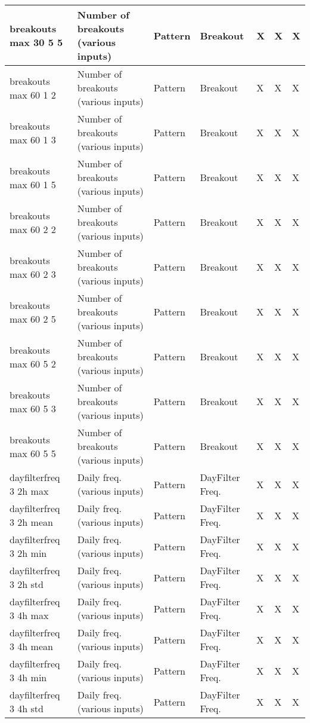{{\begin{longtable}[l]{ | p{4cm} | p{4cm} | p{1cm} | p{2cm} | p{0.3cm} | p{0.3cm} | p{0.3cm} |}
	 breakouts max 30 5 5 & Number of breakouts (various inputs) & Pattern & Breakout & X & X & X \\ \hline
	 breakouts max 60 1 2 & Number of breakouts (various inputs) & Pattern & Breakout & X & X & X \\ \hline
	 breakouts max 60 1 3 & Number of breakouts (various inputs) & Pattern & Breakout & X & X & X \\ \hline
	 breakouts max 60 1 5 & Number of breakouts (various inputs) & Pattern & Breakout & X & X & X \\ \hline
	 breakouts max 60 2 2 & Number of breakouts (various inputs) & Pattern & Breakout & X & X & X \\ \hline
	 breakouts max 60 2 3 & Number of breakouts (various inputs) & Pattern & Breakout & X & X & X \\ \hline
	 breakouts max 60 2 5 & Number of breakouts (various inputs) & Pattern & Breakout & X & X & X \\ \hline
	 breakouts max 60 5 2 & Number of breakouts (various inputs) & Pattern & Breakout & X & X & X \\ \hline
	 breakouts max 60 5 3 & Number of breakouts (various inputs) & Pattern & Breakout & X & X & X \\ \hline
	 breakouts max 60 5 5 & Number of breakouts (various inputs) & Pattern & Breakout & X & X & X \\ \hline
	 dayfilterfreq 3 2h max & Daily freq. (various inputs) & Pattern & DayFilter Freq. & X & X & X \\ \hline
	 dayfilterfreq 3 2h mean & Daily freq. (various inputs) & Pattern & DayFilter Freq. & X & X & X \\ \hline
	 dayfilterfreq 3 2h min & Daily freq. (various inputs) & Pattern & DayFilter Freq. & X & X & X \\ \hline
	 dayfilterfreq 3 2h std & Daily freq. (various inputs) & Pattern & DayFilter Freq. & X & X & X \\ \hline
	 dayfilterfreq 3 4h max & Daily freq. (various inputs) & Pattern & DayFilter Freq. & X & X & X \\ \hline
	 dayfilterfreq 3 4h mean & Daily freq. (various inputs) & Pattern & DayFilter Freq. & X & X & X \\ \hline
	 dayfilterfreq 3 4h min & Daily freq. (various inputs) & Pattern & DayFilter Freq. & X & X & X \\ \hline
	 dayfilterfreq 3 4h std & Daily freq. (various inputs) & Pattern & DayFilter Freq. & X & X & X \\ \hline

\end{longtable}}}
